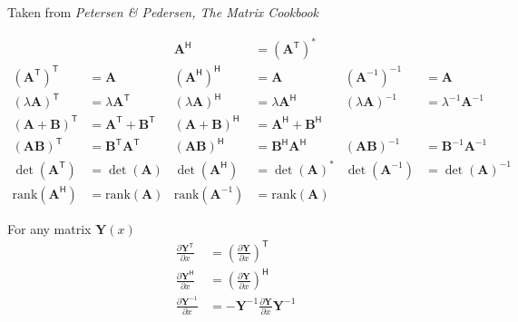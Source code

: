 Taken from \textit{Petersen \& Pedersen, The Matrix Cookbook}

{\footnotesize
    \noindent\begin{align*}
                                                          &                                                 & \mathbf{A}^\mathsf{H}                             & = {\left(\mathbf{A}^\mathsf{T}\right)}^*                                                                                       \\[.75em]
        {\left({\mathbf{A}}^\mathsf{T}\right)}^\mathsf{T} & = \mathbf{A}                                    & {\left({\mathbf{A}}^\mathsf{H}\right)}^\mathsf{H} & = \mathbf{A}                                    & {\left({\mathbf{A}}^{-1}\right)}^{-1}    & = \mathbf{A}                      \\[.75em]
        {(\lambda\mathbf{A})}^\mathsf{T}                  & = \lambda\mathbf{A}^\mathsf{T}                  & {(\lambda\mathbf{A})}^\mathsf{H}                  & = \lambda\mathbf{A}^\mathsf{H}                  & {(\lambda\mathbf{A})}^{-1}               & = \lambda^{-1}\mathbf{A}^{-1}     \\[.75em]
        {\left(\mathbf{A}+\mathbf{B}\right)}^\mathsf{T}   & = \mathbf{A}^\mathsf{T} + \mathbf{B}^\mathsf{T} & {\left(\mathbf{A}+\mathbf{B}\right)}^\mathsf{H}   & = \mathbf{A}^\mathsf{H} + \mathbf{B}^\mathsf{H}                                                                                \\[.75em]
        {\left(\mathbf{A}\mathbf{B}\right)}^\mathsf{T}    & = \mathbf{B}^\mathsf{T}\mathbf{A}^\mathsf{T}    & {\left(\mathbf{A}\mathbf{B}\right)}^\mathsf{H}    & = \mathbf{B}^\mathsf{H}\mathbf{A}^\mathsf{H}    & {\left(\mathbf{A}\mathbf{B}\right)}^{-1} & = \mathbf{B}^{-1} \mathbf{A}^{-1} \\[.75em]
        \det(\mathbf{A}^\mathsf{T})                       & = \det(\mathbf{A})                              & \det(\mathbf{A}^\mathsf{H})                       & = {\det(\mathbf{A})}^*                          & \det(\mathbf{A}^{-1})                    & = {\det(\mathbf{A})}^{-1}         \\[.75em]
        \mathrm{rank}{(\mathbf{A}^\mathsf{H})}            & = \mathrm{rank}(\mathbf{A})                     & \mathrm{rank}{(\mathbf{A}^{-1} )}                 & = \mathrm{rank}(\mathbf{A})
    \end{align*}
}



For any matrix $\mathbf{Y}(x)$
\noindent\begin{align*}
    \frac{\partial \mathbf{Y}^{\mathsf{T}}}{\partial x} & ={\left(\frac{\partial \mathbf{Y}}{\partial x}\right)}^{\mathsf{T}}   \\
    \frac{\partial \mathbf{Y}^{\mathsf{H}}}{\partial x} & ={\left(\frac{\partial \mathbf{Y}}{\partial x}\right)}^{\mathsf{H}}   \\
    \frac{\partial\mathbf{Y}^{-1}}{\partial x}          & =-\mathbf{Y}^{-1}\frac{\partial\mathbf{Y}}{\partial x}\mathbf{Y}^{-1}
\end{align*}


